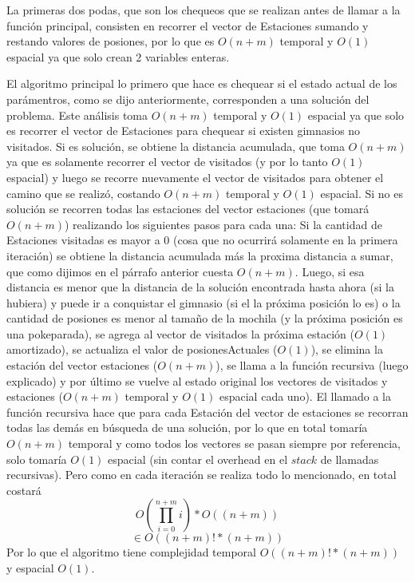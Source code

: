 \begin{itemize}
      La primeras dos podas, que son los chequeos que se realizan antes de llamar a la función principal, consisten en recorrer el vector de Estaciones sumando y restando valores de posiones, por lo que es $O(n+m)$ temporal y $O(1)$ espacial ya que solo crean 2 variables enteras.

      El algoritmo principal lo primero que hace es chequear si el estado actual de los parámentros, como se dijo anteriormente, corresponden a una solución del problema. Este análisis toma $O(n+m)$ temporal y $O(1)$ espacial ya que solo es recorrer el vector de Estaciones para chequear si existen gimnasios no visitados. Si es solución, se obtiene la distancia acumulada, que toma $O(n+m)$ ya que es solamente recorrer el vector de visitados (y por lo tanto $O(1)$ espacial) y luego se recorre nuevamente el vector de visitados para obtener el camino que se realizó, costando $O(n+m)$ temporal y $O(1)$ espacial.
      Si no es solución se recorren todas las estaciones del vector estaciones (que tomará $O(n+m)$) realizando los siguientes pasos para cada una: Si la cantidad de Estaciones visitadas es mayor a 0 (cosa que no ocurrirá solamente en la primera iteración) se obtiene la distancia acumulada más la proxima distancia a sumar, que como dijimos en el párrafo anterior cuesta $O(n+m)$. Luego, si esa distancia es menor que la distancia de la solución encontrada hasta ahora (si la hubiera) y puede ir a conquistar el gimnasio (si el la próxima posición lo es) o la cantidad de posiones es menor al tamaño de la mochila (y la próxima posición es una pokeparada), se agrega al vector de visitados la próxima estación ($O(1)$ amortizado), se actualiza el valor de posionesActuales ($O(1)$), se elimina la estación del vector estaciones ($O(n+m)$), se llama a la función recursiva (luego explicado) y por último se vuelve al estado original los vectores de visitados y estaciones ($O(n+m)$ temporal y $O(1)$ espacial cada uno).
      El llamado a la función recursiva hace que para cada Estación del vector de estaciones se recorran todas las demás en búsqueda de una solución, por lo que en total tomaría $O(n+m)$ temporal y como todos los vectores se pasan siempre por referencia, solo tomaría $O(1)$ espacial (sin contar el overhead en el $stack$ de llamadas recursivas). Pero como en cada iteración se realiza todo lo mencionado, en total costará
      \[
        O(\prod_{i=0}^{n+m} i)*O((n+m))
      \]
      \[
        \in O((n+m)! * (n+m))
      \]
      Por lo que el algoritmo tiene complejidad temporal $O((n+m)! * (n+m))$ y espacial $O(1)$.


\end{itemize}
